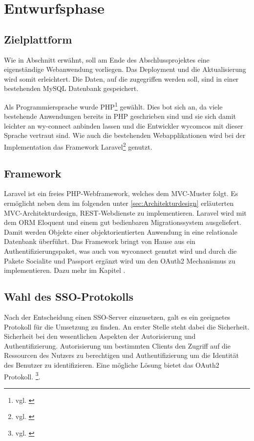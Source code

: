 \section{Entwurfsphase} 
\label{sec:Entwurfsphase}

\subsection{Zielplattform}
\label{sec:Zielplattform}

Wie in Abschnitt  erwähnt, soll am Ende des Abschlussprojektes eine eigenständige Webanwendung vorliegen. Das Deployment und die Aktualisierung wird somit erleichtert.
Die Daten, auf die zugegriffen werden soll, sind in einer bestehenden MySQL Datenbank gespeichert. 

Als Programmiersprache wurde \acs{PHP}\footnote{vgl. \cite{PHP}} gewählt. Dies bot sich an, da viele bestehende Anwendungen bereits in PHP geschrieben sind und sie sich damit leichter an wy-connect anbinden lassen und die Entwickler wycomcos mit dieser Sprache vertraut sind. 
Wie auch die bestehenden Webapplikationen wird bei der Implementation das Framework Laravel\footnote{vgl. \cite{Laravel}} genutzt.

\subsection{Framework}
\label{sec:Framework}

Laravel ist ein freies \acs{PHP}-Webframework, welches dem \acs{MVC}-Muster folgt. 
Es ermöglicht neben dem im folgenden unter \ref{sec:Architekturdesign} erläuterten MVC-Architekturdesign, \acs{REST}-Webdienste zu implementieren.
Laravel wird mit dem \acs{ORM} Eloquent und einem gut bedienbaren Migrationssystem ausgeliefert. Damit werden Objekte einer objektorientierten Anwendung in eine relationale Datenbank überführt.
Das Framework bringt von Hause aus ein Authentifizierungspaket, was auch von wyconnect genutzt wird und durch die Pakete Socialite und Passport ergänzt wird um den OAuth2 Mechanismus zu implementieren. Dazu mehr im Kapitel .

\subsection{Wahl des SSO-Protokolls}
\label{sec:Protokollwahl}

Nach der Entscheidung einen \acs{SSO}-Server einzusetzen, galt es ein geeignetes Protokoll für die Umsetzung zu finden. 
An erster Stelle steht dabei die Sicherheit. Sicherheit bei den wesentlichen Aspekten der Autorisierung und Authentifizierung. Autorisierung um bestimmten Clients den Zugriff auf die Ressourcen des Nutzers zu berechtigen und Authentifizierung um die Identität des Benutzer zu identifizieren. Eine mögliche Lösung bietet das OAuth2 Protokoll. \footnote{vgl. \cite{OAuth2}}.

